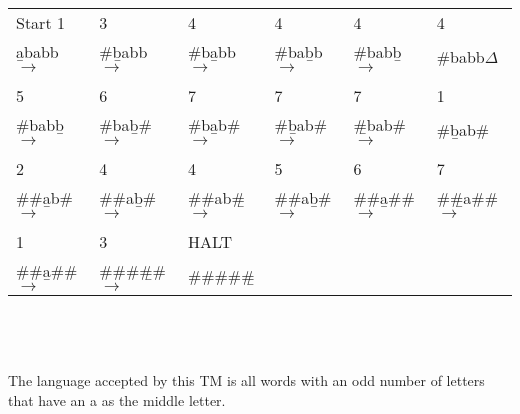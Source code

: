 \documentclass[10pt]{report}
\begin{document}
\subsection{}
\begin{tabular}{l l l l l l}
Start 1& 3& 4 & 4 & 4 & 4\\
\b{a}babb $\rightarrow$ & \#\b{b}abb $\rightarrow$ & \#b\b{a}bb $\rightarrow$ & \#ba\b{b}b $\rightarrow$ & \#bab\b{b} $\rightarrow$ & \#babb\b{$\Delta$}\\
&&&&&\\
5& 6 & 7 & 7 & 7 & 1\\
\#bab\b{b} $\rightarrow$ & \#ba\b{b}\# $\rightarrow$ & \#b\b{a}b\# $\rightarrow$ & \#\b{b}ab\# $\rightarrow$ & \b{\#}bab\# $\rightarrow$ & \#\b{b}ab\#\\
&&&&&\\
2 &4& 4 & 5 & 6 & 7\\
\#\#\b{a}b\# $\rightarrow$ & \#\#a\b{b}\# $\rightarrow$ & \#\#ab\b{#} $\rightarrow$ & \#\#a\b{b}\# $\rightarrow$ & \#\#\b{a}\#\# $\rightarrow$ & \#\b{\#}a\#\# $\rightarrow$\\
&&&&&\\
1& 3 & HALT &&&\\
\#\#\b{a}\#\# $\rightarrow$ & \#\#\#\b{\#}\# $\rightarrow$ & \#\#\#\#\b{\#} &&&\\
\end{tabular}\\

\clearpage
\section{}
The language accepted by this TM is all words with an odd number of letters that have an a as
the middle letter.
\end{document}
